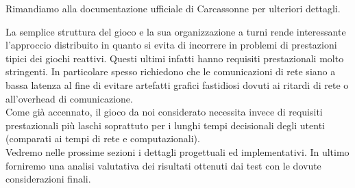 Rimandiamo alla documentazione ufficiale di Carcassonne per ulteriori
dettagli.

La semplice struttura del gioco e la sua organizzazione a turni rende
interessante l'approccio distribuito in quanto si evita di incorrere in problemi 
di prestazioni tipici dei giochi reattivi. Questi ultimi infatti hanno requisiti prestazionali molto stringenti. In
particolare spesso richiedono che le comunicazioni di rete siano a bassa
latenza al fine di evitare
artefatti grafici fastidiosi dovuti ai ritardi di rete o all'overhead di
comunicazione.\\
Come già accennato, il gioco da noi considerato necessita invece di
requisiti prestazionali più laschi soprattuto per i lunghi tempi
decisionali degli utenti (comparati ai tempi di rete e computazionali).
\\
Vedremo nelle prossime sezioni i dettagli progettuali ed implementativi.
In ultimo forniremo una analisi valutativa dei risultati ottenuti dai test
con le dovute considerazioni finali.
